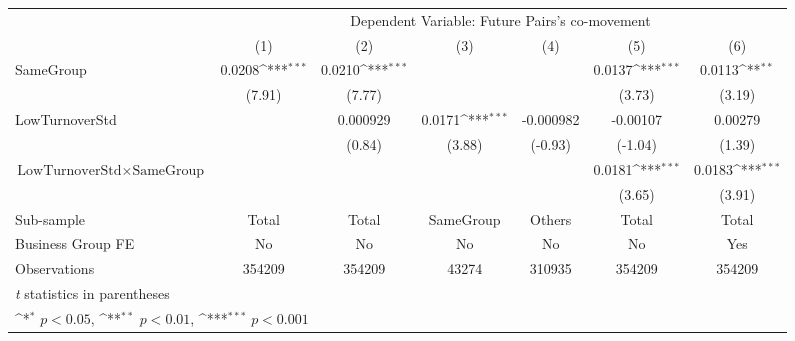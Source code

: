 {
\def\sym#1{\ifmmode^{#1}\else\(^{#1}\)\fi}
\begin{tabular}{l*{6}{c}}
\hline\hline
                &\multicolumn{6}{c}{Dependent Variable:  Future Pairs's co-movement}                                              \\\cmidrule(lr){2-7}
                &\multicolumn{1}{c}{(1)}         &\multicolumn{1}{c}{(2)}         &\multicolumn{1}{c}{(3)}         &\multicolumn{1}{c}{(4)}         &\multicolumn{1}{c}{(5)}         &\multicolumn{1}{c}{(6)}         \\
\hline
SameGroup       &   0.0208\sym{***}&   0.0210\sym{***}&                  &                  &   0.0137\sym{***}&   0.0113\sym{**} \\
                &   (7.91)         &   (7.77)         &                  &                  &   (3.73)         &   (3.19)         \\
[1em]
LowTurnoverStd  &                  & 0.000929         &   0.0171\sym{***}&-0.000982         & -0.00107         &  0.00279         \\
                &                  &   (0.84)         &   (3.88)         &  (-0.93)         &  (-1.04)         &   (1.39)         \\
[1em]
$ {\text{LowTurnoverStd} } \times {\text{SameGroup} }  $ &                  &                  &                  &                  &   0.0181\sym{***}&   0.0183\sym{***}\\
                &                  &                  &                  &                  &   (3.65)         &   (3.91)         \\
\hline
Sub-sample      &    Total         &    Total         &SameGroup         &   Others         &    Total         &    Total         \\
Business Group FE&       No         &       No         &       No         &       No         &       No         &      Yes         \\
Observations    &   354209         &   354209         &    43274         &   310935         &   354209         &   354209         \\
\hline\hline
\multicolumn{7}{l}{\footnotesize \textit{t} statistics in parentheses}\\
\multicolumn{7}{l}{\footnotesize \sym{*} \(p<0.05\), \sym{**} \(p<0.01\), \sym{***} \(p<0.001\)}\\
\end{tabular}
}
